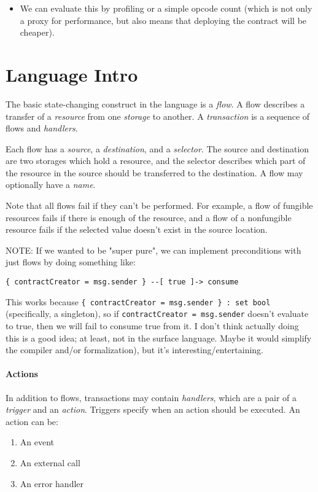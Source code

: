 \documentclass[10pt]{article}
\begin{document}
\begin{itemize}
        \begin{itemize}
            \item We can evaluate this by profiling or a simple opcode count (which is not only a proxy for performance, but also means that deploying the contract will be cheaper).
        \end{itemize}
\end{itemize}


\section{Language Intro}

The basic state-changing construct in the language is a \emph{flow}.
A flow describes a transfer of a \emph{resource} from one \emph{storage} to another.
A \emph{transaction} is a sequence of flows and \emph{handlers}.

Each flow has a \emph{source}, a \emph{destination}, and a \emph{selector}.
The source and destination are two storages which hold a resource, and the selector describes which part of the resource in the source should be transferred to the destination.
A flow may optionally have a \emph{name}.

Note that all flows fail if they can't be performed.
For example, a flow of fungible resources fails if there is enough of the resource, and a flow of a nonfungible resource fails if the selected value doesn't exist in the source location.


NOTE: If we wanted to be "super pure", we can implement preconditions with just flows by doing something like:
\begin{lstlisting}
{ contractCreator = msg.sender } --[ true ]-> consume
\end{lstlisting}
This works because \lstinline|{ contractCreator = msg.sender } : set bool| (specifically, a singleton), so if \lstinline{contractCreator = msg.sender} doesn't evaluate to true, then we will fail to consume true from it.
I don't think actually doing this is a good idea; at least, not in the surface language.
Maybe it would simplify the compiler and/or formalization), but it's interesting/entertaining.

\paragraph{Actions}
In addition to flows, transactions may contain \emph{handlers}, which are a pair of a \emph{trigger} and an \emph{action}.
Triggers specify when an action should be executed.
An action can be:
\begin{enumerate}
    \item An event
    \item An external call
    \item An error handler
\end{enumerate}
\end{document}
